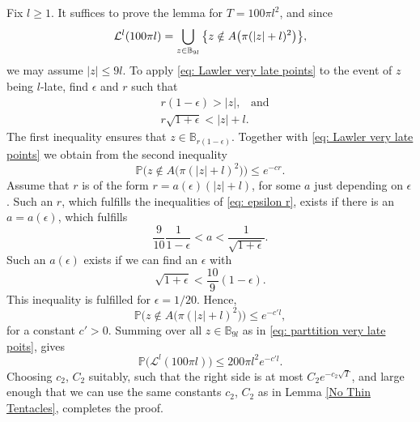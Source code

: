 \documentclass[11pt]{article}
\makeatletter
\renewenvironment{proof}[1][\proofname]{
   \par\pushQED{\qed}\normalfont
   \topsep6\p@\@plus6\p@\relax
   \trivlist\item[\hskip\labelsep\bfseries#1\@addpunct{.}]
   \ignorespaces
}{
   \popQED\endtrivlist\@endpefalse
}
\numberwithin{equation}{section}
\makeatother
\begin{document}
\begin{proof}[Proof of Lemma \ref{No Very Late Point}]
  Fix $l \geq 1$. It suffices to prove the lemma for 
  $T=100\pi l^2$, and since 
  \begin{equation}\label{eq: parttition very late poits}
      \mathcal{L}^l(100\pi l) 
    = \bigcup_{z \in \mathbb{B}_{9l}}  
      \big{\{} z \notin A 
        \big( \pi ( |z| + l ) ^2 \big) \big{\}},
  \end{equation}
  we may assume $|z| \leq 9l$.
  To apply \eqref{eq: Lawler very late points} to the event of $z$ being $l$-late,
  find $\epsilon$ and $r$ such that
  \begin{equation}\label{eq: epsilon r}
    \begin{split}
      & r (1-\epsilon) > |z|, \;\;\; \text{and}\\
      & r \sqrt{1+ \epsilon} < |z| + l. 
    \end{split}
  \end{equation}
  The first inequality ensures that $z \in \mathbb{B}_{r (1-\epsilon)}$. 
  Together with \eqref{eq: Lawler very late points} 
  we obtain from the second inequality
  \begin{equation} \nonumber
    \mathbb{P} \big( z \notin A 
      \big( \pi ( |z| + l ) ^2 \big) \big)
      \leq e^{-c r}. 
  \end{equation}
  Assume that $r$ is of the form 
  $r = a(\epsilon)(|z| + l)$, 
  for some $a$ just depending on $\epsilon$.
  Such an $r$, which 
  fulfills the inequalities of \eqref{eq: epsilon r}, 
  exists if there is an $a=a(\epsilon)$, which fulfills
  $$
    \frac{9}{10} \frac{1}{1-\epsilon}
    < a < \frac{1}{\sqrt{1+\epsilon}}.
  $$
  Such an $a(\epsilon)$ exists if we can find an $\epsilon$ with 
  $$
    \sqrt{1+\epsilon} < \frac{10}{9} (1-\epsilon).
  $$
  This inequality is fulfilled for $\epsilon = 1/20$. Hence, 
  \begin{equation}
    \mathbb{P} \big( z \notin A 
      \big( \pi ( |z| + l ) ^2 \big) \big)
      \leq e^{-c' l},
      \nonumber
  \end{equation}
  for a constant $c' > 0$. 
  Summing over all $z \in \mathbb{B}_{9l}$ as in \eqref{eq: parttition very late poits}, gives
  $$
    \mathbb{P} \big( \mathcal{L}^l(100\pi l) \big)
    \leq 200 \pi l^2 e^{-c'l}.
  $$
  Choosing $c_2$, $C_2$ suitably, such that 
  the right side is at most $C_2 e^{-c_2 \sqrt{T}}$,
  and large enough that we can use the same constants $c_2$, $C_2$ 
  as in Lemma \ref{No Thin Tentacles}, completes the proof.
\end{proof}


\newpage
{}
\end{document}

